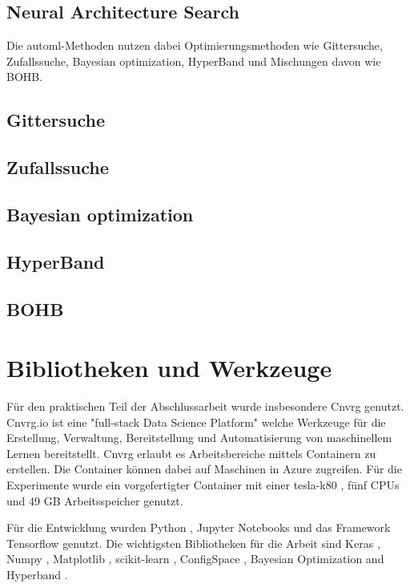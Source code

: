 	\subsection{Neural Architecture Search}
	\cite{Elsken.2019}	

	Die \ac{automl}-Methoden nutzen dabei Optimierungsmethoden wie Gittersuche, Zufallssuche, Bayesian optimization, HyperBand und Mischungen davon wie BOHB. 

	\subsection{Gittersuche}
			\cite{Michelucci.2018}
	\subsection{Zufallssuche}
			\cite{BergstraJamesandYoshuaBengio..2012}
			\cite{Michelucci.2018}
	\subsection{Bayesian optimization}
			\cite{Michelucci.2018}
	\subsection{HyperBand}	
			\cite{Li.2017}
	\subsection{BOHB}
			\cite{StefanFalkner.2018}	
	

	\section{Bibliotheken und Werkzeuge}
	\label{sec:BibliothekenundWerkzeuge}
	Für den praktischen Teil der Abschlussarbeit wurde insbesondere Cnvrg \cite{cnvrg.io.} genutzt. Cnvrg.io ist eine "full-stack Data Science Platform" welche Werkzeuge für die Erstellung, Verwaltung, Bereitstellung und Automatisierung von maschinellem Lernen bereitstellt. Cnvrg erlaubt es Arbeitsbereiche mittels Containern zu erstellen. Die Container können dabei auf Maschinen in Azure \cite{Micorsoft.2020} zugreifen. Für die Experimente wurde ein vorgefertigter Container mit einer tesla-k80 \cite{Nvidia.2020}, fünf CPUs und 49 GB Arbeitsspeicher genutzt. 

	Für die Entwicklung wurden Python \cite{PythonSoftwareFoundation.2020}, Jupyter Notebooks \cite{ProjectJupyter} und das Framework Tensorflow \cite{MartinAbadi.2015}  genutzt. Die wichtigsten Bibliotheken für die Arbeit sind Keras \cite{Chollet.2015} , Numpy \cite{Oliphant.2006} , Matplotlib \cite{Hunter.2007} , scikit-learn \cite{Pedregosa.2011} , ConfigSpace \cite{Lindauer.8162019} , Bayesian Optimization and Hyperband \cite{StefanFalkner.2018}. 
	
